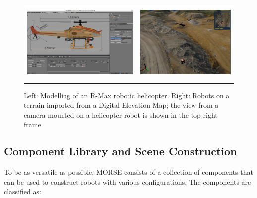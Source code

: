 \documentclass{llncs}
\begin{document}
\begin{figure}[ht!]
\centering
\begin{tabular}{cc}
 \includegraphics[height=1.55in]{pics/MORSE-rmax_mesh.png} &
 \includegraphics[height=1.55in]{pics/MORSE-quarry_ok-1.png}
\end{tabular}
\caption{Left: Modelling of an R-Max robotic helicopter. Right: Robots on a
    terrain imported from a Digital Elevation Map; the view from a camera mounted
    on a helicopter robot is shown in the top right frame}
\label{fig:models}
\end{figure}


\subsection{Component Library and Scene Construction}
\label{section:components}

To be as versatile as possible, MORSE consists of a collection of components
that can be used to construct robots with various configurations. The
components are classified as:
\end{document}
